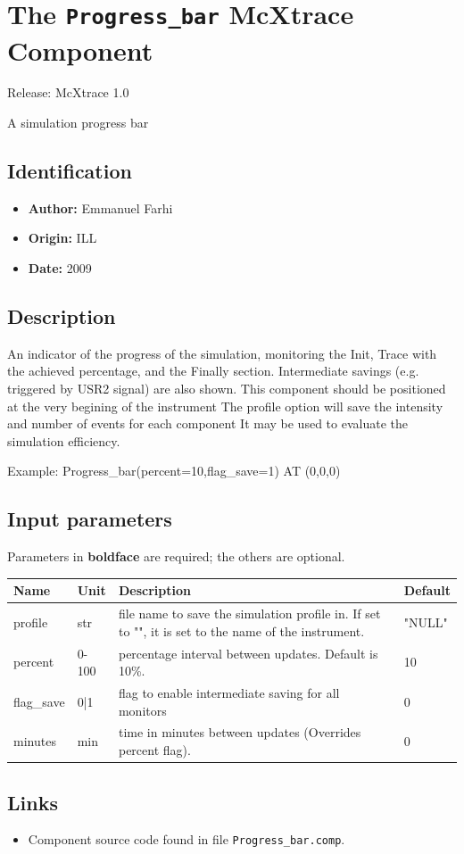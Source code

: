 \section{The \texttt{Progress\_bar} McXtrace Component}
Release: McXtrace 1.0

A simulation progress bar

\subsection*{Identification}
\begin{itemize}
  \item \textbf{Author:} Emmanuel Farhi
  \item \textbf{Origin:} ILL
  \item \textbf{Date:} 2009
\end{itemize}

\subsection*{Description}
An indicator of the progress of the simulation, monitoring the Init, Trace with the achieved percentage, and the Finally section. Intermediate savings (e.g. triggered by USR2 signal) are also shown. This component should be positioned at the very begining of the instrument The profile option will save the intensity and number of events for each component It may be used to evaluate the simulation efficiency.

Example: Progress\_bar(percent=10,flag\_save=1) AT (0,0,0)

\subsection*{Input parameters}
Parameters in \textbf{boldface} are required; the others are optional.

\begin{longtable}{p{}p{}p{}p{}}
\toprule
\textbf{Name} & \textbf{Unit} & \textbf{Description} & \textbf{Default} \\
\midrule
\endhead
profile & str & file name to save the simulation profile in. If set to "", it is set to the name of the instrument. & "NULL" \\
percent & 0-100 & percentage interval between updates. Default is 10\%. & 10 \\
flag\_save & 0|1 & flag to enable intermediate saving for all monitors & 0 \\
minutes & min & time in minutes between updates (Overrides percent flag). & 0 \\
\bottomrule
\end{longtable}

\subsection*{Links}
\begin{itemize}
  \item Component source code found in file \texttt{Progress\_bar.comp}.
\end{itemize}
